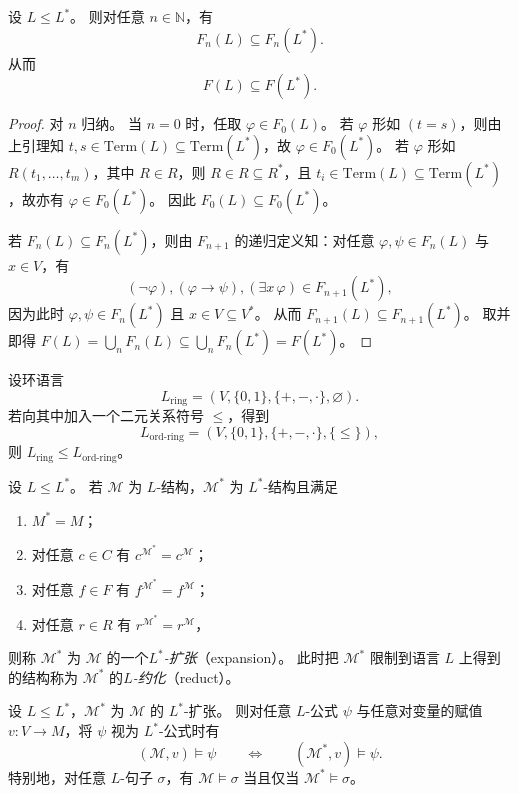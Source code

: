 \documentclass[lang=cn,a4paper,newtx,section]{elegantbook}
\begin{document}
 \begin{lemma}
 设 $L\le L^*$。
 则对任意 $n\in\mathbb N$，有
 \[
   F_n(L)\subseteq F_n(L^*).
 \]
 从而
 \[
   F(L)\subseteq F(L^*).
 \]
 \end{lemma}

 \begin{proof}
 对 $n$ 归纳。
 当 $n=0$ 时，任取 $\varphi\in F_0(L)$。
 若 $\varphi$ 形如 $(t=s)$，则由上引理知 $t,s\in\mathrm{Term}(L)\subseteq\mathrm{Term}(L^*)$，故 $\varphi\in F_0(L^*)$。
 若 $\varphi$ 形如 $R(t_1,\dots,t_m)$，其中 $R\in R$，则 $R\in R\subseteq R^*$，且 $t_i\in\mathrm{Term}(L)\subseteq\mathrm{Term}(L^*)$，故亦有 $\varphi\in F_0(L^*)$。
 因此 $F_0(L)\subseteq F_0(L^*)$。

 若 $F_n(L)\subseteq F_n(L^*)$，则由 $F_{n+1}$ 的递归定义知：对任意 $\varphi,\psi\in F_n(L)$ 与 $x\in V$，有
 \[
   (\neg\varphi),(\varphi\to\psi),(\exists x\,\varphi)\in F_{n+1}(L^*),
 \]
 因为此时 $\varphi,\psi\in F_n(L^*)$ 且 $x\in V\subseteq V^*$。
 从而 $F_{n+1}(L)\subseteq F_{n+1}(L^*)$。
 取并即得 $F(L)=\bigcup_n F_n(L)\subseteq\bigcup_n F_n(L^*)=F(L^*)$。
 \end{proof}

 \begin{example}
 设环语言
 \[
   L_{\mathrm{ring}}=(V,\{0,1\},\{+,-,\cdot\},\varnothing).
 \]
 若向其中加入一个二元关系符号 $\le$，得到
 \[
   L_{\mathrm{ord\text{-}ring}}=(V,\{0,1\},\{+,-,\cdot\},\{\le\}),
 \]
 则 $L_{\mathrm{ring}}\le L_{\mathrm{ord\text{-}ring}}$。
 \end{example}

 \begin{definition}[结构的扩张与约化]
 \label{expansion-and-reduct}
 设 $L\le L^*$。
 若 $\mathcal M$ 为 $L$-结构，$\mathcal M^*$ 为 $L^*$-结构且满足
 \begin{enumerate}
   \item $M^*=M$；
   \item 对任意 $c\in C$ 有 $c^{\mathcal M^*}=c^{\mathcal M}$；
   \item 对任意 $f\in F$ 有 $f^{\mathcal M^*}=f^{\mathcal M}$；
   \item 对任意 $r\in R$ 有 $r^{\mathcal M^*}=r^{\mathcal M}$，
 \end{enumerate}
 则称 $\mathcal M^*$ 为 $\mathcal M$ 的一个\emph{$L^*$-扩张}（expansion）。
 此时把 $\mathcal M^*$ 限制到语言 $L$ 上得到的结构称为 $\mathcal M^*$ 的\emph{$L$-约化}（reduct）。
 \end{definition}

 \begin{proposition}
 \label{expansion-preserves-satisfaction}
 设 $L\le L^*$，$\mathcal M^*$ 为 $\mathcal M$ 的 $L^*$-扩张。
 则对任意 $L$-公式 $\psi$ 与任意对变量的赋值 $v:V\to M$，将 $\psi$ 视为 $L^*$-公式时有
 \[
   (\mathcal M,v)\models\psi\qquad\Longleftrightarrow\qquad(\mathcal M^*,v)\models\psi.
 \]
 特别地，对任意 $L$-句子 $\sigma$，有 $\mathcal M\models\sigma$ 当且仅当 $\mathcal M^*\models\sigma$。
 \end{proposition}
\end{document}
